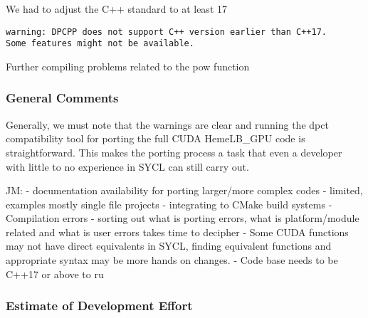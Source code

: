 \documentclass[../main]{subfiles}
\begin{document}
We had to adjust the C++ standard to at least 17
\begin{verbatim}
warning: DPCPP does not support C++ version earlier than C++17. 
Some features might not be available.
\end{verbatim}

Further compiling problems related to the pow function


\subsubsection{General Comments}
Generally, we must note that the warnings are clear and running the dpct compatibility tool for porting the full CUDA HemeLB\_GPU code is straightforward. This makes the porting process a task that even a developer with little to no experience in SYCL can still carry out.  

JM:
- documentation availability for porting larger/more complex codes - limited, examples mostly single file projects
- integrating to CMake build systems
- Compilation errors - sorting out what is porting errors, what is platform/module related and what is user errors takes time to decipher
- Some CUDA functions may not have direct equivalents in SYCL, finding equivalent functions and appropriate syntax may be more hands on changes.
- Code base needs to be C++17 or above to ru



\subsubsection{Estimate of Development Effort}
\end{document}
